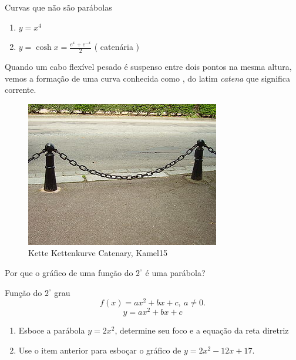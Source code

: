 \begin{frame}[label=conicas]{Curvas que não são parábolas}
	\begin{enumerate}
		\item $y=x^4$
		\item $y=\cosh x=\frac{e^x+e^{-x}}{2}$  ( catenária ) 
	\end{enumerate}
	
	
	Quando um cabo flexível pesado é suspenso entre dois pontos  na mesma altura, vemos a formação de uma curva conhecida como , do latim \textit{catena} que significa corrente. 
	\begin{figure}
		\includegraphics[scale=0.5]{figuras/catenaria.png}
		\caption{Kette Kettenkurve Catenary, Kamel15}
	\end{figure}
	
\end{frame}


\begin{frame}[label=conicas]{Por que o gráfico de uma função do $2^\circ$ é uma parábola?}
\begin{block}{Função do $2^\circ$ grau}
	\[f(x)=ax^2+bx+c, \ a\neq 0.\]
	\[y=ax^2+bx+c\]
\end{block}

\begin{exe}
\begin{enumerate}
\item Esboce a parábola $y=2x^2$, determine seu foco e a equação da reta 
diretriz
\item Use o item anterior para esboçar o gráfico de  $y=2x^2-12x+17$.
\end{enumerate}
\end{exe}

\end{frame}





